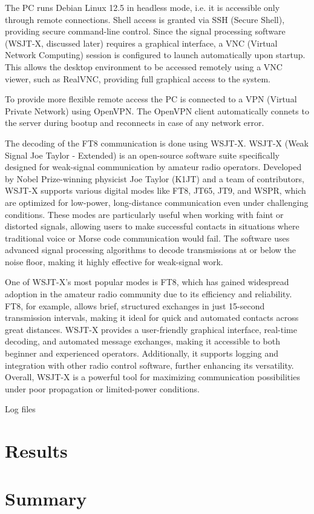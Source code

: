 \documentclass[conference]{IEEEtran}
\begin{document}
The PC runs Debian Linux 12.5 in headless mode, i.e. it is accessible
only through remote connections. Shell access is granted via
SSH (Secure Shell), providing secure command-line control. Since the signal
processing software (WSJT-X, discussed later) requires a graphical interface, a
VNC (Virtual Network Computing) session is configured to launch automatically
upon startup. This allows the desktop environment to be accessed remotely using
a VNC viewer, such as RealVNC, providing full graphical access to the system.

To provide more flexible remote access the PC is connected to a VPN (Virtual
Private Network) using OpenVPN. The OpenVPN client automatically connets to
the server during bootup and reconnects in case of any network error.

The decoding of the FT8 communication is done using WSJT-X.
WSJT-X (Weak Signal Joe Taylor - Extended) is an open-source software suite
specifically designed for weak-signal communication by amateur radio operators.
Developed by Nobel Prize-winning physicist Joe Taylor (K1JT) and a team of
contributors, WSJT-X supports various digital modes like FT8, JT65, JT9, and
WSPR, which are optimized for low-power, long-distance communication even under
challenging conditions. These modes are particularly useful when working with
faint or distorted signals, allowing users to make successful contacts in
situations where traditional voice or Morse code communication would fail. The
software uses advanced signal processing algorithms to decode transmissions at
or below the noise floor, making it highly effective for weak-signal work.

One of WSJT-X's most popular modes is FT8, which has gained widespread adoption
in the amateur radio community due to its efficiency and reliability. FT8, for
example, allows brief, structured exchanges in just 15-second transmission
intervals, making it ideal for quick and automated contacts across great
distances. WSJT-X provides a user-friendly graphical interface, real-time
decoding, and automated message exchanges, making it accessible to both
beginner and experienced operators. Additionally, it supports logging and
integration with other radio control software, further enhancing its
versatility. Overall, WSJT-X is a powerful tool for maximizing communication
possibilities under poor propagation or limited-power conditions.

Log files

\cite{silver2011}
\cite{cervera2021}
\cite{hartje2020}
\cite{zolesi2014}
\cite{taylor2010}
\cite{hunsucker2007}

\section{Results}

\section{Summary}




\end{document}
